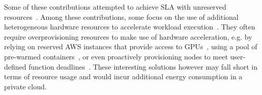 
Some of these contributions attempted to achieve SLA with unreserved resources~\cite{gujaratiSwayamDistributedAutoscaling2017, zhangMArkExploitingCloud, mampageDeadlineawareDynamicResource2021, singhviAtollScalableLowLatency2021, handaoui2020releaser, handaoui2020salamander, yalles2022riscless}.
Among these contributions, some focus on the use of additional heterogeneous hardware resources to accelerate workload execution~\cite{zhangMArkExploitingCloud, lingPigeonDynamicEfficient2019, yangINFlessNativeServerless2022}.
They often require overprovisioning resources to make use of hardware acceleration, e.g. by relying on reserved AWS instances that provide access to GPUs~\cite{zhangMArkExploitingCloud}, using a pool of pre-warmed containers~\cite{lingPigeonDynamicEfficient2019}, or even proactively provisioning nodes to meet user-defined function deadlines~\cite{singhviAtollScalableLowLatency2021}. These interesting solutions however may fall short in terms of resource usage and would incur additional energy consumption in a private cloud.

